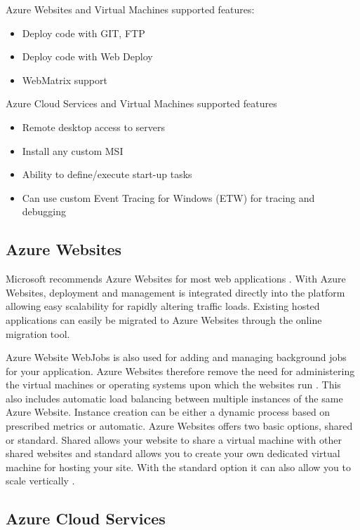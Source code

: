 Azure Websites and Virtual Machines supported features:
\begin{itemize}
\item Deploy code with GIT, FTP \checkmark
\item Deploy code with Web Deploy \checkmark
\item WebMatrix support
\end{itemize}
 
Azure Cloud Services and Virtual Machines supported features
\begin{itemize}
\item Remote desktop access to servers
\item Install any custom MSI
\item Ability to define/execute start-up tasks
\item Can use custom Event Tracing for Windows (ETW) for tracing and debugging
\end{itemize} 


\subsection{Azure Websites}

Microsoft recommends Azure Websites for most web applications \cite{Microsoft_Corporation2014-gg}. With Azure Websites, deployment and management is integrated directly into the platform allowing easy scalability for rapidly altering traffic loads. Existing hosted applications can easily be migrated to Azure Websites through the online migration tool.
 
Azure Website WebJobs is also used for adding and managing background jobs for your application. Azure Websites therefore remove the need for administering the virtual machines or operating systems upon which the websites run \cite{Microsoft_Corporation_undated-ej}. This also includes automatic load balancing between multiple instances of the same Azure Website. Instance creation can be either a dynamic process based on prescribed metrics or automatic. Azure Websites offers two basic options, shared or standard. Shared allows your website to share a virtual machine with other shared websites and standard allows you to create your own dedicated virtual machine for hosting your site. With the standard option it can also allow you to scale vertically \cite{Microsoft_Corporation_undated-ej}.

\subsection{Azure Cloud Services}


